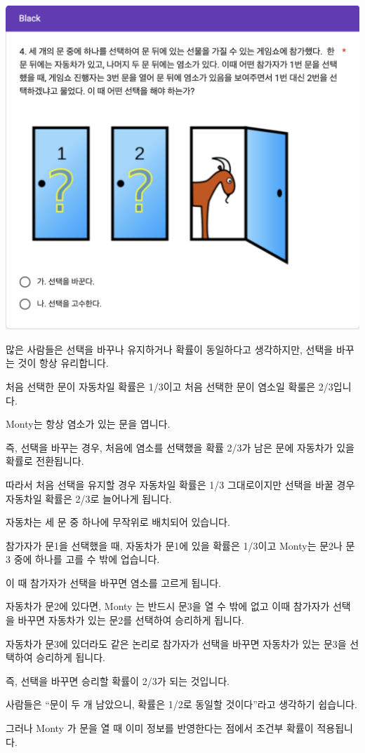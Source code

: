 \documentclass[
]{book}
\begin{document}
\includegraphics[width=0.75\linewidth]{./pics/Quiz240524_Q4_Black}

많은 사람들은 선택을 바꾸나 유지하거나 확률이 동일하다고 생각하지만, 선택을 바꾸는 것이 항상 유리합니다.

처음 선택한 문이 자동차일 확률은 1/3이고 처음 선택한 문이 염소일 확룰은 2/3입니다.

Monty는 항상 염소가 있는 문을 엽니다.

즉, 선택을 바꾸는 경우, 처음에 염소를 선택했을 확률 2/3가 남은 문에 자동차가 있을 확률로 전환됩니다.

따라서 처음 선택을 유지할 경우 자동차일 확률은 1/3 그대로이지만 선택을 바꿀 경우 자동차일 확률은 2/3로 늘어나게 됩니다.

자동차는 세 문 중 하나에 무작위로 배치되어 있습니다.

참가자가 문1을 선택했을 때, 자동차가 문1에 있을 확률은 1/3이고 Monty는 문2나 문3 중에 하나를 고를 수 밖에 업습니다.

이 때 참가자가 선택을 바꾸면 염소를 고르게 됩니다.

자동차가 문2에 있다면, Monty 는 반드시 문3을 열 수 밖에 없고 이때 참가자가 선택을 바꾸면 자동차가 있는 문2를 선택하여 승리하게 됩니다.

자동차가 문3에 있더라도 같은 논리로 참가자가 선택을 바꾸면 자동차가 있는 문3을 선택하여 승리하게 됩니다.

즉, 선택을 바꾸면 승리할 확률이 2/3가 되는 것입니다.

사람들은 ``문이 두 개 남았으니, 확률은 1/2로 동일할 것이다''라고 생각하기 쉽습니다.

그러나 Monty 가 문을 열 때 이미 정보를 반영한다는 점에서 조건부 확률이 적용됩니다.
\end{document}

